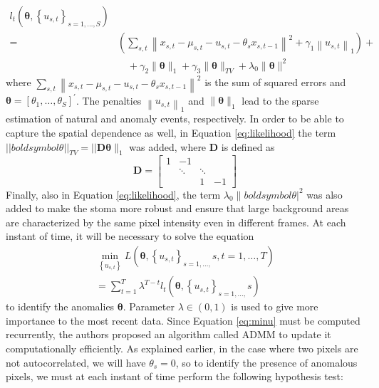 \begin{equation}
\label{eq:likelihood}
\begin{aligned}
l_t\left(\boldsymbol{\theta},\left\{u_{s, t}\right\}_{s=1, \ldots, S}\right) & \\
= & \left(\sum_{s, t}\left\|x_{s, t}-\mu_{s, t}-u_{s, t}-\theta_s x_{s, t-1}\right\|^2+\gamma_1\left\|u_{s, t}\right\|_1\right)+ \\
& \quad+\gamma_2\|\boldsymbol{\theta}\|_1+\gamma_3\|\boldsymbol{\theta}\|_{T V}+\lambda_0\|\boldsymbol{\theta}\|^2
\end{aligned}
\end{equation}
where $\sum_{s, t}\left\|x_{s, t}-\mu_{s, t}-u_{s, t}-\theta_s x_{s, t-1}\right\|^2$ is the sum of squared errors and $\bm{\theta}=\left[\theta_1, \ldots, \theta_S\right]^{\prime}$. The penalties $\left\|u_{s, t}\right\|_1$ and $\|\boldsymbol{\theta}\|_1$ lead to the sparse estimation of natural and anomaly events, respectively. In order to be able to capture the spatial dependence as well, in Equation \ref{eq:likelihood} the term $||boldsymbol{\theta}||_{T V}=||\boldsymbol{D} \boldsymbol{\theta}\|_1$ was added, where $\boldsymbol{D}$ is defined as
\begin{equation*}
    \boldsymbol{D}=\left[\begin{array}{cccc}
1 & -1 & & \\
& \ddots & \ddots & \\
& & 1 & -1
\end{array}\right]
\end{equation*}
Finally, also in Equation \ref{eq:likelihood}, the term $\lambda_0\|boldsymbol{\theta}|^2$ was also added to make the stoma more robust and ensure that large background areas are characterized by the same pixel intensity even in different frames. At each instant of time, it will be necessary to solve the equation
\begin{equation}
\label{eq:minu}
\begin{gathered}
\min _{\left\{u_{s, t}\right\}} L\left(\boldsymbol{\theta},\left\{u_{s, t}\right\}_{s=1, \ldots,} s, t=1, \ldots, T\right) \\
=\sum_{t=1}^T \lambda^{T-t} l_t\left(\boldsymbol{\theta},\left\{u_{s, t}\right\}_{s=1, \ldots,} s\right)
\end{gathered}
\end{equation}
to identify the anomalies $\bm{\theta}$. Parameter $\lambda \in (0,1)$ is used to give more importance to the most recent data. Since Equation \ref{eq:minu} must be computed recurrently, the authors proposed an algorithm called ADMM to update it computationally efficiently. As explained earlier, in the case where two pixels are not autocorrelated, we will have $\theta_s=0$, so to identify the presence of anomalous pixels, we must at each instant of time perform the following hypothesis test:
